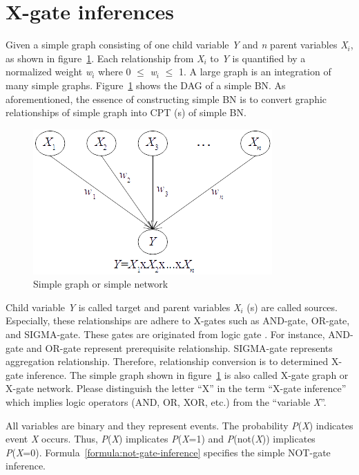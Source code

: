 \documentclass{article}
\numberwithin{equation}{section}
\numberwithin{figure}{section}
\numberwithin{table}{section}
\begin{document}
\section{X-gate inferences}
Given a simple graph consisting of one child variable \textit{Y} and \textit{n} parent variables \textit{X${}_{i}$}, as shown in figure~\ref{figure:simple-graph}. Each relationship from \textit{X${}_{i}$} to \textit{Y} is quantified by a normalized weight \textit{w${}_{i}$} where 0 $\mathrm{\le}$ \textit{w${}_{i}$} $\mathrm{\le}$ 1. A large graph is an integration of many simple graphs. Figure~\ref{figure:simple-graph} shows the DAG of a simple BN. As aforementioned, the essence of constructing simple BN is to convert graphic relationships of simple graph into CPT (s) of simple BN.

\begin{figure}
\centering
\includegraphics{SimpleGraph.png}
\caption{Simple graph or simple network}
\label{figure:simple-graph}
\end{figure}

Child variable \textit{Y} is called target and parent variables \textit{X${}_{i}$} (s) are called sources. Especially, these relationships are adhere to X-gates such as AND-gate, OR-gate, and SIGMA-gate. These gates are originated from logic gate \cite{wikipedia:logic-gates}. For instance, AND-gate and OR-gate represent prerequisite relationship. SIGMA-gate represents aggregation relationship. Therefore, relationship conversion is to determined X-gate inference. The simple graph shown in figure~\ref{figure:simple-graph} is also called X-gate graph or X-gate network. Please distinguish the letter ``X'' in the term ``X-gate inference'' which implies logic operators (AND, OR, XOR, etc.) from the ``variable \textit{X}''.

All variables are binary and they represent events. The probability \textit{P}(\textit{X}) indicates event \textit{X} occurs. Thus, \textit{P}(\textit{X}) implicates \textit{P}(\textit{X}=1) and \textit{P}(not(\textit{X})) implicates \textit{P}(\textit{X}=0). Formula~\ref{formula:not-gate-inference} specifies the simple NOT-gate inference.
\end{document}

